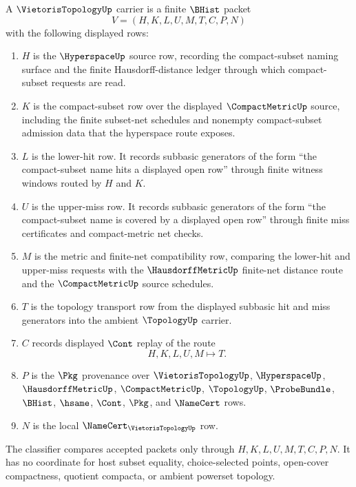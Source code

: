 \begin{definition}
\label{def:vietoris-topology-carrier}
A $\VietorisTopologyUp$ carrier is a finite $\BHist$ packet
$$
V=(H,K,L,U,M,T,C,P,N)
$$
with the following displayed rows:
\begin{enumerate}
\item $H$ is the $\HyperspaceUp$ source row, recording the compact-subset naming surface and the finite Hausdorff-distance ledger through which compact-subset requests are read.
\item $K$ is the compact-subset row over the displayed $\CompactMetricUp$ source, including the finite subset-net schedules and nonempty compact-subset admission data that the hyperspace route exposes.
\item $L$ is the lower-hit row. It records subbasic generators of the form ``the compact-subset name hits a displayed open row'' through finite witness windows routed by $H$ and $K$.
\item $U$ is the upper-miss row. It records subbasic generators of the form ``the compact-subset name is covered by a displayed open row'' through finite miss certificates and compact-metric net checks.
\item $M$ is the metric and finite-net compatibility row, comparing the lower-hit and upper-miss requests with the $\HausdorffMetricUp$ finite-net distance route and the $\CompactMetricUp$ source schedules.
\item $T$ is the topology transport row from the displayed subbasic hit and miss generators into the ambient $\TopologyUp$ carrier.
\item $C$ records displayed $\Cont$ replay of the route
$$
H,K,L,U,M \longmapsto T .
$$
\item $P$ is the $\Pkg$ provenance over $\VietorisTopologyUp$, $\HyperspaceUp$, $\HausdorffMetricUp$, $\CompactMetricUp$, $\TopologyUp$, $\ProbeBundle$, $\BHist$, $\hsame$, $\Cont$, $\Pkg$, and $\NameCert$ rows.
\item $N$ is the local $\NameCert_{\VietorisTopologyUp}$ row.
\end{enumerate}
The classifier compares accepted packets only through $H,K,L,U,M,T,C,P,N$. It has no coordinate for host subset equality, choice-selected points, open-cover compactness, quotient compacta, or ambient powerset topology.
\end{definition}

